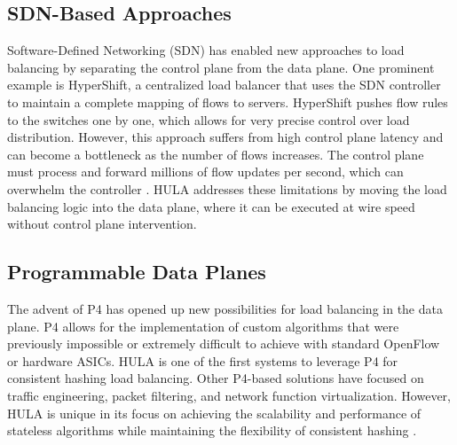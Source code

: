 \documentclass[12pt,a4paper]{article}
\begin{document}
\subsection{SDN-Based Approaches}

Software-Defined Networking (SDN) has enabled new approaches to load balancing by separating the control plane from the data plane. One prominent example is HyperShift, a centralized load balancer that uses the SDN controller to maintain a complete mapping of flows to servers. HyperShift pushes flow rules to the switches one by one, which allows for very precise control over load distribution. However, this approach suffers from high control plane latency and can become a bottleneck as the number of flows increases. The control plane must process and forward millions of flow updates per second, which can overwhelm the controller \cite{ref22}. HULA addresses these limitations by moving the load balancing logic into the data plane, where it can be executed at wire speed without control plane intervention.

\subsection{Programmable Data Planes}

The advent of P4 has opened up new possibilities for load balancing in the data plane. P4 allows for the implementation of custom algorithms that were previously impossible or extremely difficult to achieve with standard OpenFlow or hardware ASICs. HULA is one of the first systems to leverage P4 for consistent hashing load balancing. Other P4-based solutions have focused on traffic engineering, packet filtering, and network function virtualization. However, HULA is unique in its focus on achieving the scalability and performance of stateless algorithms while maintaining the flexibility of consistent hashing \cite{ref23}.

\begin{table}[H]
  \centering
  \caption{Comparison of Load Balancing Systems}
  \label{tab:comparison}
\end{table}
\end{document}
